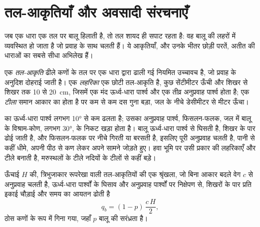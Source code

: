 \section{तल-आकृतियाँ और अवसादी संरचनाएँ}\label{sec:b1:clastic-sediments:bedforms}

जब एक धारा एक तल पर बालू हिलाती है, तो तल शायद ही सपाट रहता है: वह बालू की लहरों में व्यवस्थित हो जाता है जो प्रवाह के साथ चलती हैं। ये आकृतियाँ, और उनके भीतर छोड़ी परतें, अतीत की धाराओं का सबसे सीधा अभिलेख हैं।

\begin{definition}[तल-आकृति, लहरिका, टीला]\label{def:b1:clastic-sediments:bedform}
एक \emph{तल-आकृति} ढीले कणों के तल पर एक धारा द्वारा ढाली गई नियमित उच्चावच है, जो प्रवाह के अनुदिश दोहराई जाती है। एक \emph{लहरिका} एक छोटी तल-आकृति है, कुछ सेंटीमीटर ऊँची और शिखर से शिखर तक 10 से \qty{20}{cm}, जिसमें एक मंद ऊर्ध्व-धारा पार्श्व और एक तीव्र अनुप्रवाह पार्श्व होता है; एक \emph{टीला} समान आकार का होता है पर कम से कम दस गुना बड़ा, जल के नीचे डेसीमीटर से मीटर ऊँचा।
\end{definition}

 का ऊर्ध्व-धारा पार्श्व लगभग \ang{10} से कम ढलता है; उसका अनुप्रवाह पार्श्व, फिसलन-फलक, जल में बालू के विश्राम-कोण, लगभग \ang{30}, के निकट खड़ा होता है। बालू ऊर्ध्व-धारा पार्श्व से घिसती है, शिखर के पार ढोई जाती है, और फिसलन-फलक पर नीचे गिरती या बरसती है, इसलिए पूरी  अनुप्रवाह चलती है, पानी से कहीं धीमे, अपनी पीठ से कण लेकर अपने सामने जोड़ते हुए। हवा भूमि पर उसी प्रकार की लहरिकाएँ और टीले बनाती है, मरुस्थलों के टीले नदियों के टीलों से कहीं बड़े।

\begin{proposition}[तल-आकृति का प्रवास और तल-भार]\label{prop:b1:clastic-sediments:migration}
ऊँचाई $H$ की, त्रिभुजाकार रूपरेखा वाली तल-आकृतियों की एक श्रृंखला, जो बिना आकार बदले वेग $c$ से अनुप्रवाह चलती है, ऊर्ध्व-धारा पार्श्वों के घिसाव और अनुप्रवाह पार्श्वों पर निक्षेपण से, शिखरों के पार प्रति इकाई चौड़ाई और समय  का आयतन ढोती है
\[
  q_b = (1 - p)\,\frac{c\,H}{2},
\]
ठोस कणों के रूप में गिना गया, जहाँ $p$ बालू की सरंध्रता है।
\end{proposition}

